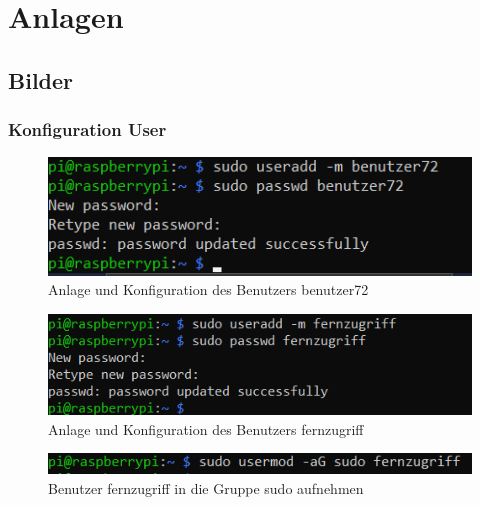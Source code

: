 \documentclass[a4paper, 11pt]{scrartcl}
\begin{document}
\newpage
\section{Anlagen}
\subsection{Bilder}\label{ch:pics}

\subsubsection{Konfiguration User}\label{ch:pic_user}
\begin{figure}[H]
    \begin{center}
        \includegraphics[scale=1]{Bilder/useradd_benutzer72.png}
        \caption{Anlage und Konfiguration des Benutzers \glqq benutzer72\grqq}\label{pic:useradd_72}
    \end{center}
\end{figure}

\begin{figure}[H]
    \begin{center}
        \includegraphics[scale=1]{Bilder/useradd_fernzugriff.png}
        \caption{Anlage und Konfiguration des Benutzers \glqq fernzugriff\grqq}\label{pic:useradd_fernzugriff}
    \end{center}
\end{figure}

\begin{figure}[H]
    \begin{center}
        \includegraphics[scale=1]{Bilder/sudo_fernzugriff.png}
        \caption{Benutzer \glqq fernzugriff\grqq{} in die Gruppe sudo aufnehmen}\label{pic:usermod_fernzugriff}
    \end{center}
\end{figure}
\end{document}
